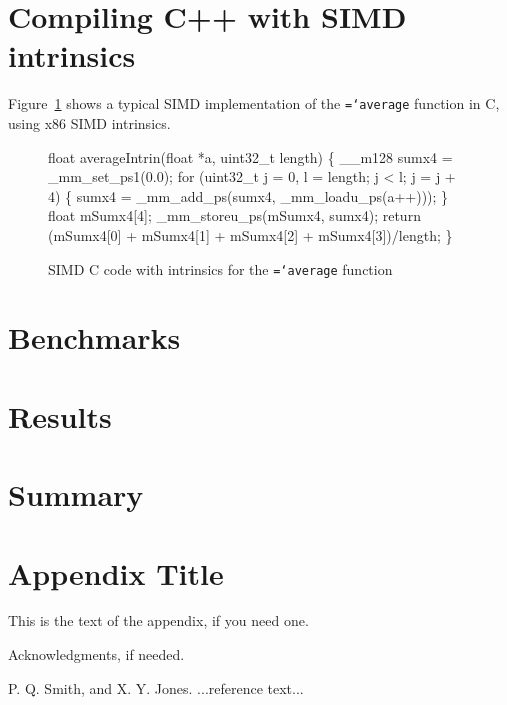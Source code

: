 \documentclass[preprint]{sigplanconf}
\newcommand{\ttt}[1]{{\texttt{\hyphenchar\font=`\-\relax #1}}}%
\begin{document}
\section{Compiling C++ with SIMD intrinsics}

Figure~\ref{fig:average-intrin} shows a typical SIMD implementation of the
\ttt{average} function in C, using x86 SIMD intrinsics.

\begin{figure}
\begin{small}
\begin{program}[style=tt, number=true]
fl\tab{}oat averageIntrin(float *a, uint32\_t length) \{
  \_\_m128 sumx4 = \_mm\_set\_ps1(0.0);
  fo\tab{}r (uint32\_t j = 0, l = length; j < l; j = j + 4) \{
    sumx4 = \_mm\_add\_ps(sumx4, \_mm\_loadu\_ps(a++)));\untab{}
  \}
  float mSumx4[4];
  \_mm\_storeu\_ps(mSumx4, sumx4);
  return (\tab{}mSumx4[0] + mSumx4[1] +
          mSumx4[2] + mSumx4[3])/length;\untab{}\untab{}
\}
\end{program}
\end{small}
\caption{SIMD C code with intrinsics for the \ttt{average} function}
\label{fig:average-intrin}
\end{figure}



\section{Benchmarks}

\section{Results}

\section{Summary}

\appendix
\section{Appendix Title}

This is the text of the appendix, if you need one.

\acks

Acknowledgments, if needed.





\begin{thebibliography}{}
\softraggedright

P. Q. Smith, and X. Y. Jones. ...reference text...

\end{thebibliography}
\end{document}
